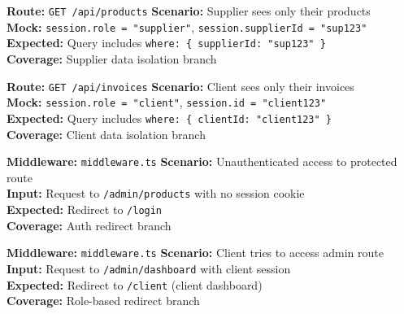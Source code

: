 \documentclass[12pt,a4paper]{report}
\newcommand{\pone}{\textbf{\color{p1red}P1}}
\begin{document}
\begin{tcolorbox}[criticalbox,title={RBAC-002 \hfill \pone\ --- Supplier Data Isolation}]
\textbf{Route:} \texttt{GET /api/products} \quad \textbf{Scenario:} Supplier sees only their products \\
\textbf{Mock:} \texttt{session.role = "supplier"}, \texttt{session.supplierId = "sup123"} \\
\textbf{Expected:} Query includes \texttt{where: \{ supplierId: "sup123" \}} \\
\textbf{Coverage:} Supplier data isolation branch
\end{tcolorbox}

\begin{tcolorbox}[criticalbox,title={RBAC-003 \hfill \pone\ --- Client Data Isolation}]
\textbf{Route:} \texttt{GET /api/invoices} \quad \textbf{Scenario:} Client sees only their invoices \\
\textbf{Mock:} \texttt{session.role = "client"}, \texttt{session.id = "client123"} \\
\textbf{Expected:} Query includes \texttt{where: \{ clientId: "client123" \}} \\
\textbf{Coverage:} Client data isolation branch
\end{tcolorbox}

\begin{tcolorbox}[criticalbox,title={RBAC-004 \hfill \pone\ --- Middleware Redirect}]
\textbf{Middleware:} \texttt{middleware.ts} \quad \textbf{Scenario:} Unauthenticated access to protected route \\
\textbf{Input:} Request to \texttt{/admin/products} with no session cookie \\
\textbf{Expected:} Redirect to \texttt{/login} \\
\textbf{Coverage:} Auth redirect branch
\end{tcolorbox}

\begin{tcolorbox}[criticalbox,title={RBAC-005 \hfill \pone\ --- Role Mismatch Redirect}]
\textbf{Middleware:} \texttt{middleware.ts} \quad \textbf{Scenario:} Client tries to access admin route \\
\textbf{Input:} Request to \texttt{/admin/dashboard} with client session \\
\textbf{Expected:} Redirect to \texttt{/client} (client dashboard) \\
\textbf{Coverage:} Role-based redirect branch
\end{tcolorbox}
\end{document}
